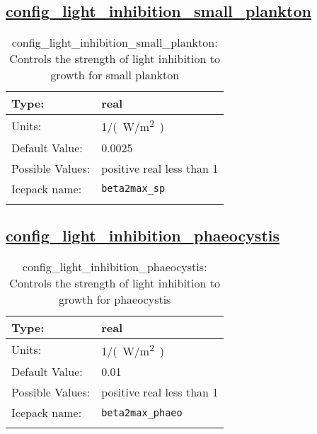 \subsection[config\_light\_inhibition\_small\_plankton]{\hyperref[sec:nm_tab_biogeochemistry]{config\_light\_inhibition\_small\_plankton}}
\label{subsec:nm_sec_config_light_inhibition_small_plankton}
\begin{center}
\begin{longtable}{| p{2.0in} || p{4.0in} |}
    \hline
    Type: & real \\
    \hline
    Units: & \si{1/(W/m^2)} \\
    \hline
    Default Value: & 0.0025 \\
    \hline
    Possible Values: & positive real less than 1 \\
    \hline
    \hline
    Icepack name: & \verb+beta2max_sp+ \\
    \caption{config\_light\_inhibition\_small\_plankton: Controls the strength of light inhibition to growth for small plankton}
\end{longtable}
\end{center}
\subsection[config\_light\_inhibition\_phaeocystis]{\hyperref[sec:nm_tab_biogeochemistry]{config\_light\_inhibition\_phaeocystis}}
\label{subsec:nm_sec_config_light_inhibition_phaeocystis}
\begin{center}
\begin{longtable}{| p{2.0in} || p{4.0in} |}
    \hline
    Type: & real \\
    \hline
    Units: & \si{1/(W/m^2)} \\
    \hline
    Default Value: & 0.01 \\
    \hline
    Possible Values: & positive real less than 1 \\
    \hline
    \hline
    Icepack name: & \verb+beta2max_phaeo+ \\
    \caption{config\_light\_inhibition\_phaeocystis: Controls the strength of light inhibition to growth for phaeocystis}
\end{longtable}
\end{center}
